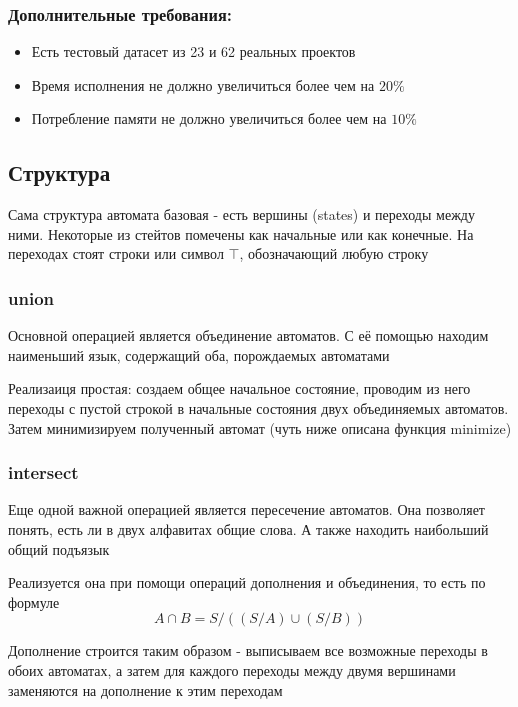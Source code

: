 \subsubsection*{Дополнительные требования:}
\begin{itemize}
    \item Есть тестовый датасет из 23 и 62 реальных проектов
    \item Время исполнения не должно увеличиться более чем на $20\%$
    \item Потребление памяти не должно увеличиться более чем на $10\%$
\end{itemize}

\newpage
\subsection{Структура}
Сама структура автомата базовая - есть вершины (states) и переходы между ними. Некоторые из стейтов помечены как начальные или как конечные. На переходах стоят строки или символ $\top$, обозначающий любую строку

\subsubsection*{union}
Основной операцией является объединение автоматов. С её помощью находим наименьший язык, содержащий оба, порождаемых автоматами

Реализаиця простая: создаем общее начальное состояние, проводим из него переходы с пустой строкой в начальные состояния двух объединяемых автоматов. Затем минимизируем полученный автомат (чуть ниже описана функция minimize)

\subsubsection*{intersect}
Еще одной важной операцией является пересечение автоматов. Она позволяет понять, есть ли в двух алфавитах общие слова. А также находить наибольший общий подъязык

Реализуется она при помощи операций дополнения и объединения, то есть по формуле \[A \cap B = S / ((S / A) \cup (S / B))\]

Дополнение строится таким образом - выписываем все возможные переходы в обоих автоматах, а затем для каждого переходы между двумя вершинами заменяются на дополнение к этим переходам

